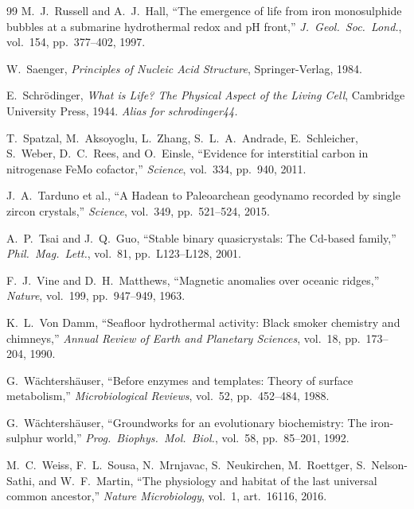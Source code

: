 \begin{thebibliography}{99}
M.~J.~Russell and A.~J.~Hall,
``The emergence of life from iron monosulphide bubbles at a submarine hydrothermal
redox and pH front,''
\emph{J.\ Geol.\ Soc.\ Lond.}, vol.~154, pp.~377--402, 1997.

W.~Saenger,
\emph{Principles of Nucleic Acid Structure},
Springer-Verlag, 1984.

E.~Schr\"odinger,
\emph{What is Life? The Physical Aspect of the Living Cell},
Cambridge University Press, 1944.
\textit{Alias for schrodinger44.}

T.~Spatzal, M.~Aksoyoglu, L.~Zhang, S.~L.~A.~Andrade, E.~Schleicher, S.~Weber,
D.~C.~Rees, and O.~Einsle,
``Evidence for interstitial carbon in nitrogenase FeMo cofactor,''
\emph{Science}, vol.~334, pp.~940, 2011.

J.~A.~Tarduno et al.,
``A Hadean to Paleoarchean geodynamo recorded by single zircon crystals,''
\emph{Science}, vol.~349, pp.~521--524, 2015.

A.~P.~Tsai and J.~Q.~Guo,
``Stable binary quasicrystals: The Cd-based family,''
\emph{Phil.\ Mag.\ Lett.}, vol.~81, pp.~L123--L128, 2001.

F.~J.~Vine and D.~H.~Matthews,
``Magnetic anomalies over oceanic ridges,''
\emph{Nature}, vol.~199, pp.~947--949, 1963.

K.~L.~Von Damm,
``Seafloor hydrothermal activity: Black smoker chemistry and chimneys,''
\emph{Annual Review of Earth and Planetary Sciences}, vol.~18, pp.~173--204, 1990.

G.~W\"achtersh\"auser,
``Before enzymes and templates: Theory of surface metabolism,''
\emph{Microbiological Reviews}, vol.~52, pp.~452--484, 1988.

G.~W\"achtersh\"auser,
``Groundworks for an evolutionary biochemistry: The iron-sulphur world,''
\emph{Prog.\ Biophys.\ Mol.\ Biol.}, vol.~58, pp.~85--201, 1992.

M.~C.~Weiss, F.~L.~Sousa, N.~Mrnjavac, S.~Neukirchen, M.~Roettger,
S.~Nelson-Sathi, and W.~F.~Martin,
``The physiology and habitat of the last universal common ancestor,''
\emph{Nature Microbiology}, vol.~1, art.~16116, 2016.



\end{thebibliography}
